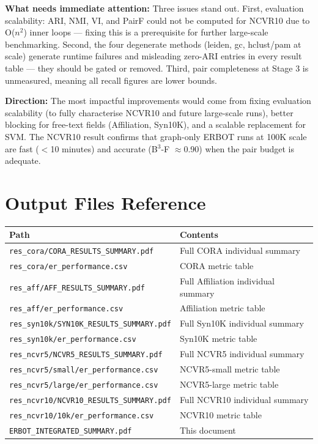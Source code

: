 \documentclass[11pt, a4paper]{article}
\begin{document}
\textbf{What needs immediate attention:} Three issues stand out. First,
evaluation scalability: ARI, NMI, VI, and PairF could not be computed for
NCVR10 due to O($n^2$) inner loops --- fixing this is a prerequisite for
further large-scale benchmarking. Second, the four degenerate methods (leiden,
gc, hclust/pam at scale) generate runtime failures and misleading zero-ARI
entries in every result table --- they should be gated or removed. Third, pair
completeness at Stage 3 is unmeasured, meaning all recall figures are lower
bounds.

\textbf{Direction:} The most impactful improvements would come from fixing
evaluation scalability (to fully characterise NCVR10 and future large-scale
runs), better blocking for free-text fields (Affiliation, Syn10K), and a
scalable replacement for SVM. The NCVR10 result confirms that graph-only ERBOT
runs at 100K scale are fast ($<$10 minutes) and accurate (B$^3$-F $\approx$0.90)
when the pair budget is adequate.

\section{Output Files Reference}

\begin{table}[h!]
\centering
\small
\begin{tabular}{ll}
\toprule
\textbf{Path} & \textbf{Contents} \\
\midrule
\texttt{res\_cora/CORA\_RESULTS\_SUMMARY.pdf}     & Full CORA individual summary \\
\texttt{res\_cora/er\_performance.csv}            & CORA metric table \\
\texttt{res\_aff/AFF\_RESULTS\_SUMMARY.pdf}       & Full Affiliation individual summary \\
\texttt{res\_aff/er\_performance.csv}             & Affiliation metric table \\
\texttt{res\_syn10k/SYN10K\_RESULTS\_SUMMARY.pdf} & Full Syn10K individual summary \\
\texttt{res\_syn10k/er\_performance.csv}          & Syn10K metric table \\
\texttt{res\_ncvr5/NCVR5\_RESULTS\_SUMMARY.pdf}   & Full NCVR5 individual summary \\
\texttt{res\_ncvr5/small/er\_performance.csv}     & NCVR5-small metric table \\
\texttt{res\_ncvr5/large/er\_performance.csv}     & NCVR5-large metric table \\
\texttt{res\_ncvr10/NCVR10\_RESULTS\_SUMMARY.pdf} & Full NCVR10 individual summary \\
\texttt{res\_ncvr10/10k/er\_performance.csv}      & NCVR10 metric table \\
\texttt{ERBOT\_INTEGRATED\_SUMMARY.pdf}           & This document \\
\bottomrule
\end{tabular}
\end{table}
\end{document}
